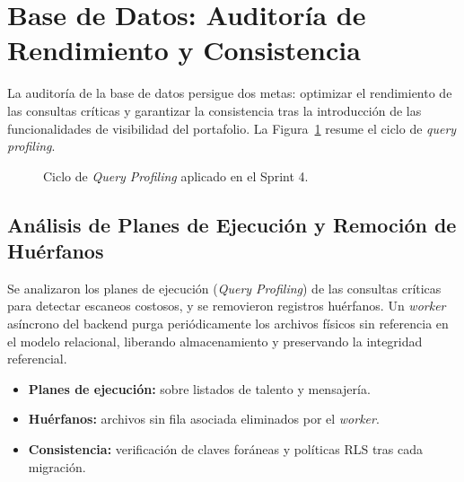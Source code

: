 \section{Base de Datos: Auditoría de Rendimiento y Consistencia}
\label{sec:s4_database}

La auditoría de la base de datos persigue dos metas: optimizar el rendimiento de las consultas
críticas y garantizar la consistencia tras la introducción de las funcionalidades de visibilidad
del portafolio. La Figura~\ref{fig:s4_profiling} resume el ciclo de \textit{query profiling}.\par

\begin{figure}[!ht]
    \centering
    \caption{Ciclo de \textit{Query Profiling} aplicado en el Sprint 4.}
    \label{fig:s4_profiling}
\end{figure}

\subsection{Análisis de Planes de Ejecución y Remoción de Huérfanos}
\label{ssec:s4_db_profiling}
Se analizaron los planes de ejecución (\textit{Query Profiling}) de las consultas críticas para
detectar escaneos costosos, y se removieron registros huérfanos. Un \textit{worker} asíncrono del
backend purga periódicamente los archivos físicos sin referencia en el modelo relacional,
liberando almacenamiento y preservando la integridad referencial.

\begin{itemize}[noitemsep]
    \item \textbf{Planes de ejecución:}  sobre listados de talento y mensajería.
    \item \textbf{Huérfanos:} archivos sin fila asociada eliminados por el \textit{worker}.
    \item \textbf{Consistencia:} verificación de claves foráneas y políticas RLS tras cada migración.
\end{itemize}

